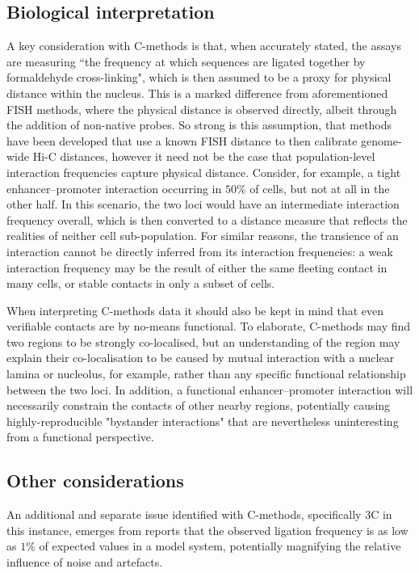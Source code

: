 \documentclass[a4paper,11pt,oneside]{book}
\begin{document}
\subsection{Biological interpretation}
A key consideration with C-methods is that, when accurately stated, the assays are measuring ``the frequency at which sequences are ligated together by formaldehyde cross-linking",\cite{Williamson2014} which is then assumed to be a proxy for physical distance within the nucleus. This is a marked difference from aforementioned FISH methods, where the physical distance is observed directly, albeit through the addition of non-native probes. So strong is this assumption, that methods have been developed that use a known FISH distance to then calibrate genome-wide Hi-C distances,\cite{Shavit2014} however it need not be the case that population-level interaction frequencies capture physical distance.\cite{Lajoie2014} Consider, for example, a tight enhancer--promoter interaction occurring in $50\%$ of cells, but not at all in the other half. In this scenario, the two loci would have an intermediate interaction frequency overall, which is then converted to a distance measure that reflects the realities of neither cell sub-population. For similar reasons, the transience of an interaction cannot be directly inferred from its interaction frequencies: a weak interaction frequency may be the result of either the same fleeting contact in many cells, or stable contacts in only a subset of cells.\cite{Lajoie2014}


When interpreting C-methods data it should also be kept in mind that even verifiable contacts are by no-means functional. To elaborate, C-methods may find two regions to be strongly co-localised, but an understanding of the region may explain their co-localisation to be caused by mutual interaction with a nuclear lamina or nucleolus, for example, rather than any specific functional relationship between the two loci.\cite{Dekker2013} In addition, a functional enhancer--promoter interaction will necessarily constrain the contacts of other nearby regions, potentially causing highly-reproducible "bystander interactions"\cite{Dekker2013} that are nevertheless uninteresting from a functional perspective. 

\subsection{Other considerations}
An additional and separate issue identified with C-methods, specifically 3C in this instance, emerges from reports that the observed ligation frequency is as low as $1\%$ of expected values in a model system,\cite{Gavrilov2013} potentially magnifying the relative influence of noise and artefacts.
\end{document}
